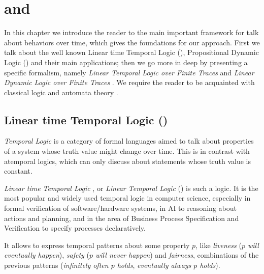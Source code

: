 \chapter{\LTLf and \LDLf}
\label{logic}

In this chapter we introduce the reader to the main important framework for talk about behaviors over time, which gives the foundations for our approach.
First we talk about the well known Linear time Temporal Logic (\LTL), Propositional Dynamic Logic (\PDL) and their main applications; then we go more in deep by presenting a specific formalism, namely \emph{Linear Temporal Logic over Finite Traces} \LTLf and \emph{Linear Dynamic Logic over Finite Traces} \LDLf.
We require the reader to be acquainted with classical logic \citep{sep-logic-classical} and automata theory \citep{Hopcroft:2000:IAT:557657}.
\section{Linear time Temporal Logic (\LTL)}
\emph{Temporal Logic} \citep{sep-logic-temporal} is a category of formal languages aimed to talk about properties of a system whose truth value might change over time. This is in contrast with atemporal logics, which can only discuss about statements whose truth value is constant. 

\emph{Linear time Temporal Logic} \citep{Pnueli:1977:TLP:1382431.1382534}, or \emph{Linear Temporal Logic} (\LTL) is such a logic. It is the most popular and widely used temporal logic in computer science, especially in formal verification of software/hardware systems, in AI to reasoning about actions and planning, and in the area of Business Process Specification and Verification to specify processes declaratively.

It allows to express temporal patterns about some property $p$, like \emph{liveness} (\emph{$p$ will eventually happen}), \emph{safety} (\emph{$p$ will never happen}) and \emph{fairness}, combinations of the previous patterns (\emph{infinitely often $p$ holds}, \emph{eventually always $p$ holds}).

